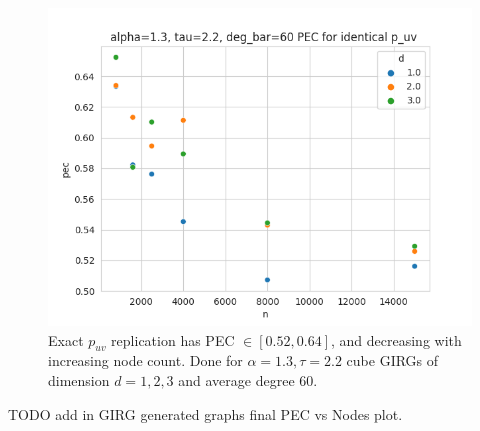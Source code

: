 \begin{figure}
  \parbox[b]{.69\textwidth}{\Large
  \includegraphics[width=\linewidth]{./figures/pec_girg_identical_puv.png}
  }
  \hfill
  \parbox[b]{.3\textwidth}{%
  \caption{Exact $p_{uv}$ replication has PEC $\in [0.52, 0.64]$, and decreasing with increasing node count. Done for $\alpha=1.3, \tau=2.2$ cube GIRGs of dimension $d=1,2,3$ and average degree $60$.}
  \label{fig:pec_girg_identical_puv}
  }
\end{figure}




TODO add in GIRG generated graphs final PEC vs Nodes plot.


